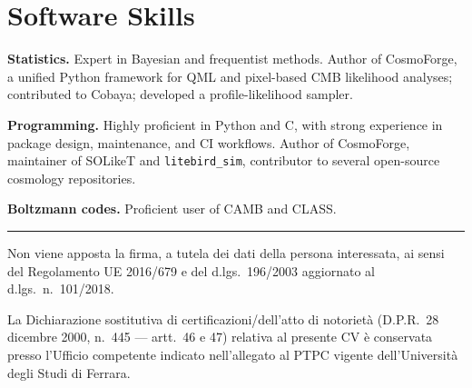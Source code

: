 \documentclass[10pt,a4paper]{article}
\begin{document}
\section*{Software Skills}
\noindent\textbf{Statistics.} Expert in Bayesian and frequentist methods. Author of CosmoForge, a unified Python framework for QML and pixel-based CMB likelihood analyses; contributed to Cobaya; developed a profile-likelihood sampler.\par\vspace{1pt}
\noindent\textbf{Programming.} Highly proficient in Python and C, with strong experience in package design, maintenance, and CI workflows. Author of CosmoForge, maintainer of SOLikeT and \texttt{litebird\_sim}, contributor to several open-source cosmology repositories.\par\vspace{1pt}
\noindent\textbf{Boltzmann codes.} Proficient user of CAMB and CLASS.

\vspace{8pt}
\noindent\textcolor{rule}{\rule{\linewidth}{0.4pt}}\par\vspace{3pt}
{\footnotesize\justifying
\noindent Non viene apposta la firma, a tutela dei dati della persona interessata, ai sensi del
Regolamento UE 2016/679 e del d.lgs.\ 196/2003 aggiornato al d.lgs.\ n.\ 101/2018.\par\vspace{3pt}
\noindent La Dichiarazione sostitutiva di certificazioni/dell'atto di notorietà
(D.P.R.\ 28 dicembre 2000, n.\ 445 --- artt.\ 46 e 47) relativa al presente CV è conservata presso
l'Ufficio competente indicato nell'allegato al PTPC vigente dell'Università degli Studi di Ferrara.\par
}

\vspace{10pt}
\end{document}

